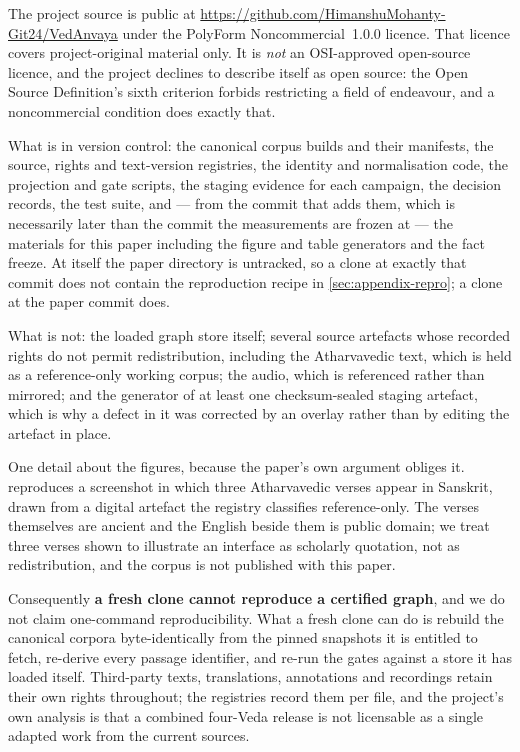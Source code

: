 The project source is public at
\url{https://github.com/HimanshuMohanty-Git24/VedAnvaya} under the PolyForm
Noncommercial~1.0.0 licence. That licence covers project-original material only. It
is \emph{not} an OSI-approved open-source licence, and the project declines to
describe itself as open source: the Open Source Definition's sixth criterion forbids
restricting a field of endeavour, and a noncommercial condition does exactly that.

What is in version control: the canonical corpus builds and their manifests, the
source, rights and text-version registries, the identity and normalisation code, the
projection and gate scripts, the staging evidence for each campaign, the decision
records, the test suite, and --- from the commit that adds them, which is necessarily later
than the commit the measurements are frozen at --- the materials for this paper
including the figure and table generators and the fact freeze. At 
itself the paper directory is untracked, so a clone at exactly that commit does not
contain the reproduction recipe in \cref{sec:appendix-repro}; a clone at the
paper commit does.

What is not: the loaded graph store itself; several source artefacts whose recorded
rights do not permit redistribution, including the Atharvavedic text, which is held
as a reference-only working corpus; the audio, which is referenced rather than
mirrored; and the generator of at least one checksum-sealed staging artefact, which
is why a defect in it was corrected by an overlay rather than by editing the
artefact in place.

One detail about the figures, because the paper's own argument obliges it.
 reproduces a screenshot in which three Atharvavedic verses appear
in Sanskrit, drawn from a digital artefact the registry classifies reference-only.
The verses themselves are ancient and the English beside them is public domain; we
treat three verses shown to illustrate an interface as scholarly quotation, not as
redistribution, and the corpus is not published with this paper.

Consequently \textbf{a fresh clone cannot reproduce a certified graph}, and we do not
claim one-command reproducibility. What a fresh clone can do is rebuild the canonical
corpora byte-identically from the pinned snapshots it is entitled to fetch, re-derive
every passage identifier, and re-run the gates against a store it has loaded itself.
Third-party texts, translations, annotations and recordings retain their own rights
throughout; the registries record them per file, and the project's own analysis is
that a combined four-Veda release is not licensable as a single adapted work from the
current sources.


